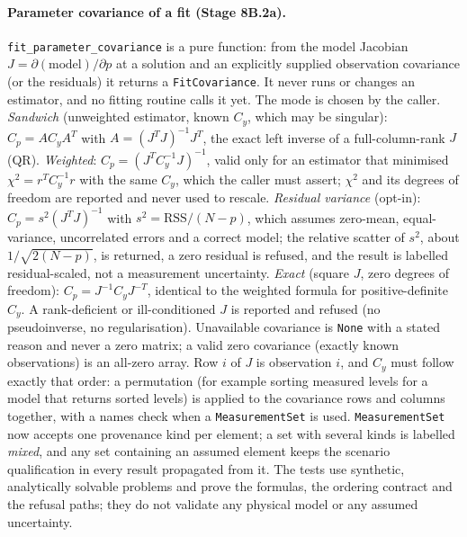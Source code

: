 \paragraph{Parameter covariance of a fit (Stage 8B.2a).} \texttt{fit\_parameter\_covariance} is a pure function: from the model Jacobian $J=\partial(\text{model})/\partial p$ at a solution and an explicitly supplied observation covariance (or the residuals) it returns a \texttt{FitCovariance}. It never runs or changes an estimator, and no fitting routine calls it yet. The mode is chosen by the caller. \emph{Sandwich} (unweighted estimator, known $C_y$, which may be singular): $C_p=AC_yA^{T}$ with $A=(J^TJ)^{-1}J^T$, the exact left inverse of a full-column-rank $J$ (QR). \emph{Weighted}: $C_p=(J^TC_y^{-1}J)^{-1}$, valid only for an estimator that minimised $\chi^2=r^TC_y^{-1}r$ with the same $C_y$, which the caller must assert; $\chi^2$ and its degrees of freedom are reported and never used to rescale. \emph{Residual variance} (opt-in): $C_p=s^2(J^TJ)^{-1}$ with $s^2=\mathrm{RSS}/(N-p)$, which assumes zero-mean, equal-variance, uncorrelated errors and a correct model; the relative scatter of $s^2$, about $1/\sqrt{2(N-p)}$, is returned, a zero residual is refused, and the result is labelled residual-scaled, not a measurement uncertainty. \emph{Exact} (square $J$, zero degrees of freedom): $C_p=J^{-1}C_yJ^{-T}$, identical to the weighted formula for positive-definite $C_y$. A rank-deficient or ill-conditioned $J$ is reported and refused (no pseudoinverse, no regularisation). Unavailable covariance is \texttt{None} with a stated reason and never a zero matrix; a valid zero covariance (exactly known observations) is an all-zero array. Row $i$ of $J$ is observation $i$, and $C_y$ must follow exactly that order: a permutation (for example sorting measured levels for a model that returns sorted levels) is applied to the covariance rows and columns together, with a names check when a \texttt{MeasurementSet} is used. \texttt{MeasurementSet} now accepts one provenance kind per element; a set with several kinds is labelled \emph{mixed}, and any set containing an assumed element keeps the scenario qualification in every result propagated from it. The tests use synthetic, analytically solvable problems and prove the formulas, the ordering contract and the refusal paths; they do not validate any physical model or any assumed uncertainty.

